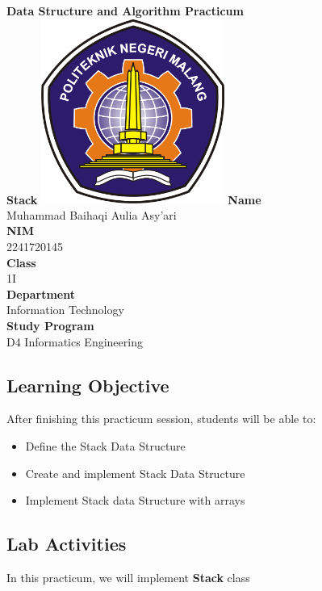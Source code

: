 \documentclass[12pt,titlepage]{article}
\newcommand{\vSubject}{Data Structure and Algorithm Practicum}
\newcommand{\vSubtitle}{Stack}
\newcommand{\vName}{Muhammad Baihaqi Aulia Asy'ari}
\newcommand{\vNIM}{2241720145}
\newcommand{\vClass}{1I}
\newcommand{\vDepartment}{Information Technology}
\newcommand{\vStudyProgram}{D4 Informatics Engineering}
\begin{document}
\begin{titlepage}
    \centering
    \vfill
    {\bfseries\LARGE
        \vSubject\\
        \vskip0.25cm
        \vSubtitle
    }
    \vfill
    \includegraphics[width=6cm]{images/polinema-logo.png}
    \vfill
    {
        \textbf{Name}\\
        \vName\\
        \vskip0.5cm
        \textbf{NIM}\\
        \vNIM\\
        \vskip0.5cm
        \textbf{Class}\\
        \vClass\\
        \vskip0.5cm
        \textbf{Department}\\
        \vDepartment\\
        \vskip0.5cm
        \textbf{Study Program}\\
        \vStudyProgram
    }
\end{titlepage}

\newpage

\setcounter{section}{1}
\subsection{Learning Objective}
After finishing this practicum session, students will be able to:

\begin{itemize}
    \item Define the Stack Data Structure
    \item Create and implement Stack Data Structure
    \item Implement Stack data Structure with arrays
\end{itemize}

\subsection{Lab Activities}
In this practicum, we will implement \textbf{Stack} class
\end{document}
